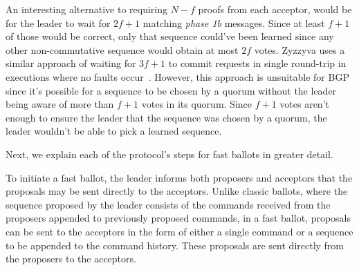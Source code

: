 An interesting alternative to requiring $N-f$ proofs from each acceptor, would be for the leader to wait for $2f+1$ matching \textit{phase 1b} messages. Since at least $f+1$ of those would be correct, only that sequence could've been learned since any other non-commutative sequence would obtain at most $2f$ votes. Zyzzyva uses a similar approach of waiting for $3f+1$ to commit requests in single round-trip in executions where no faults occur~\cite{Kotla:2008}. However, this approach is unsuitable for BGP since it's possible for a sequence to be chosen by a quorum without the leader being aware of more than $f+1$ votes in its quorum. Since $f+1$ votes aren't enough to ensure the leader that the sequence was chosen by a quorum, the leader wouldn't be able to pick a learned sequence.\par
Next, we explain each of the protocol's steps for fast ballots in greater detail.

To initiate a fast ballot, the leader informs both proposers and acceptors that the proposals may be sent directly to the acceptors. Unlike classic ballots, where the sequence proposed by the leader consists of the commands received from the proposers appended to previously proposed commands, in a fast ballot, proposals can be sent to the acceptors in the form of either a single command or a sequence to be appended to the command history. These proposals are sent directly from the proposers to the acceptors.\par

